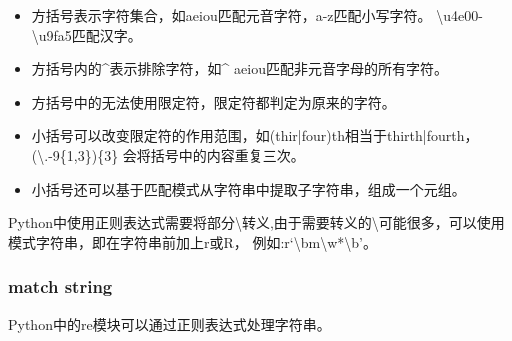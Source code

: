       \begin{itemize}
        \item 方括号表示字符集合，如\lbrack aeiou\rbrack 匹配元音字符，\lbrack a-z\rbrack 匹配小写字符。
          \lbrack\textbackslash u4e00-\textbackslash u9fa5\rbrack 匹配汉字。
        \item 方括号内的\^{}表示排除字符，如\lbrack\^{} aeiou\rbrack 匹配非元音字母的所有字符。
        \item 方括号中的无法使用限定符，限定符都判定为原来的字符。
        \item 小括号可以改变限定符的作用范围，如(thir|four)th相当于thirth|fourth，(\textbackslash .-9\rbrack\{1,3\})\{3\}
          会将括号中的内容重复三次。
        \item 小括号还可以基于匹配模式从字符串中提取子字符串，组成一个元组。
      \end{itemize}

      Python中使用正则表达式需要将部分\textbackslash 转义,由于需要转义的\textbackslash 可能很多，可以使用模式字符串，即在字符串前加上r或R，
      例如:r`\textbackslash bm\textbackslash w*\textbackslash b'。

  \subsubsection{match string}
    Python中的re模块可以通过正则表达式处理字符串。

